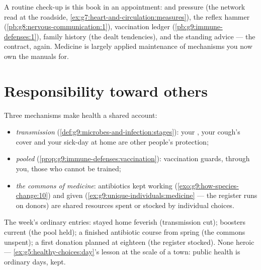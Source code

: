 \begin{example}\label{ex:g9:our-responsibility:checkup}
A routine check-up is this book in an appointment: 
and pressure (the network read at the roadside,
\cref{ex:g7:heart-and-circulation:measures}), the
reflex hammer (\cref{pb:g8:nervous-communication:1}),
vaccination ledger (\cref{pb:g9:immune-defenses:1}),
family history (the dealt tendencies), and the standing
advice --- the contract, again. Medicine is largely
applied maintenance of mechanisms you now own the
manuals for.
\end{example}

\section{Responsibility toward others}

\begin{proposition}\label{prop:g9:our-responsibility:others}
Three mechanisms make health a shared account:
\begin{itemize}
  \item \emph{transmission}
        (\cref{def:g9:microbes-and-infection:stages}):
        your , your cough's cover and your sick-day
        at home are other people's protection;
  \item \emph{pooled }
        (\cref{prop:g9:immune-defenses:vaccination}):
        vaccination guards, through you, those who cannot
        be trained;
  \item \emph{the commons of medicine}: antibiotics kept
        working (\cref{exo:g9:how-species-change:10}) and
         given (\cref{ex:g9:unique-individuals:medicine}
        --- the register runs on donors) are shared
        resources spent or stocked by individual choices.
\end{itemize}
\end{proposition}
\admitted

\begin{example}\label{ex:g9:our-responsibility:account}
The week's ordinary entries: stayed home feverish
(transmission cut); boosters current (the pool held); a
finished antibiotic course from spring (the commons
unspent); a first  donation planned at eighteen
(the register stocked). None heroic ---
\cref{ex:g5:healthy-choices:day}'s lesson at the scale
of a town: public health is ordinary days, kept.
\end{example}

